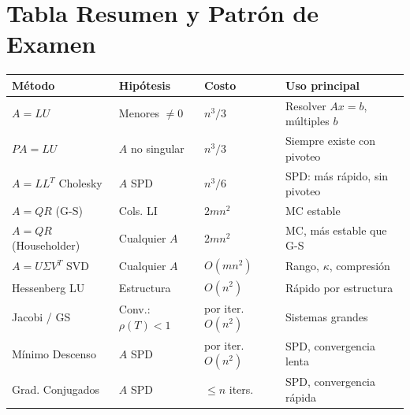 \documentclass[12pt,a4paper]{article}
\begin{document}
\section{Tabla Resumen y Patrón de Examen}

\begin{center}
\renewcommand{\arraystretch}{1.3}
\begin{tabular}{p{2.8cm}p{2.5cm}p{2.3cm}p{5cm}}
\toprule
\textbf{Método} & \textbf{Hipótesis} & \textbf{Costo} & \textbf{Uso principal} \\
\midrule
$A=LU$ & Menores $\ne0$ & $n^3/3$ & Resolver $Ax=b$, múltiples $b$ \\
$PA=LU$ & $A$ no singular & $n^3/3$ & Siempre existe con pivoteo \\
$A=LL^T$ Cholesky & $A$ SPD & $n^3/6$ & SPD: más rápido, sin pivoteo \\
$A=QR$ (G-S) & Cols. LI & $2mn^2$ & MC estable \\
$A=QR$ (Householder) & Cualquier $A$ & $2mn^2$ & MC, más estable que G-S \\
$A=U\Sigma V^T$ SVD & Cualquier $A$ & $O(mn^2)$ & Rango, $\kappa$, compresión \\
Hessenberg LU & Estructura & $O(n^2)$ & Rápido por estructura \\
Jacobi / GS & Conv.: $\rho(T)<1$ & por iter. $O(n^2)$ & Sistemas grandes \\
Mínimo Descenso & $A$ SPD & por iter. $O(n^2)$ & SPD, convergencia lenta \\
Grad. Conjugados & $A$ SPD & $\le n$ iters. & SPD, convergencia rápida \\
\bottomrule
\end{tabular}
\end{center}
\end{document}
